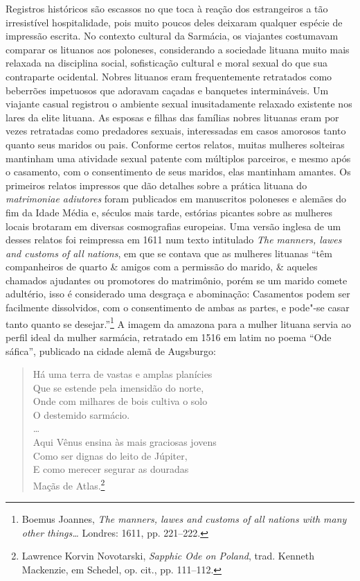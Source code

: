 Registros históricos são escassos no que toca à reação dos estrangeiros
a tão irresistível hospitalidade, pois muito poucos deles deixaram
qualquer espécie de impressão escrita. No contexto cultural da Sarmácia,
os viajantes costumavam comparar os lituanos aos poloneses, considerando
a sociedade lituana muito mais relaxada na disciplina social,
sofisticação cultural e moral sexual do que sua contraparte ocidental.
Nobres lituanos eram frequentemente retratados como beberrões impetuosos
que adoravam caçadas e banquetes intermináveis. Um viajante casual
registrou o ambiente sexual inusitadamente relaxado existente nos lares
da elite lituana. As esposas e filhas das famílias nobres lituanas eram
por vezes retratadas como predadores sexuais, interessadas em casos
amorosos tanto quanto seus maridos ou pais. Conforme certos relatos,
muitas mulheres solteiras mantinham uma atividade sexual patente com
múltiplos parceiros, e mesmo após o casamento, com o consentimento de
seus maridos, elas mantinham amantes. Os primeiros relatos impressos que
dão detalhes sobre a prática lituana do \textit{matrimoniae adiutores}
foram publicados em manuscritos poloneses e alemães do fim da Idade
Média e, séculos mais tarde, estórias picantes sobre as mulheres locais
brotaram em diversas cosmografias europeias. Uma versão inglesa de um
desses relatos foi reimpressa em 1611 num texto intitulado \textit{The
manners, lawes and customs of all nations}, em que se contava que as
mulheres lituanas ``têm companheiros de quarto \& amigos com a permissão
do marido, \& aqueles chamados ajudantes ou promotores do matrimônio,
porém se um marido comete adultério, isso é considerado uma desgraça e
abominação: Casamentos podem ser facilmente dissolvidos, com o
consentimento de ambas as partes, e pode"-se casar tanto quanto se
desejar.''\footnote{Boemus Joannes, \textit{The manners, lawes and customs of all nations with many other things\ldots{}} Londres: 1611, pp. 221--222.} A imagem da amazona para a mulher lituana servia ao perfil ideal da mulher sarmácia, retratado em 1516 em latim no poema ``Ode
sáfica'', publicado na cidade alemã de Augsburgo:

\begin{verse}
Há uma terra de vastas e amplas planícies\\
Que se estende pela imensidão do norte,\\
Onde com milhares de bois cultiva o solo\\
O destemido sarmácio.\\
\ldots{}\\

Aqui Vênus ensina às mais graciosas jovens\\
Como ser dignas do leito de Júpiter,\\
E como merecer segurar as douradas\\
Maçãs de Atlas.\footnote{Lawrence Korvin Novotarski, \textit{Sapphic Ode on Poland}, trad. Kenneth Mackenzie, em Schedel, op. cit., pp. 111--112.}
\end{verse}
\asterisc

